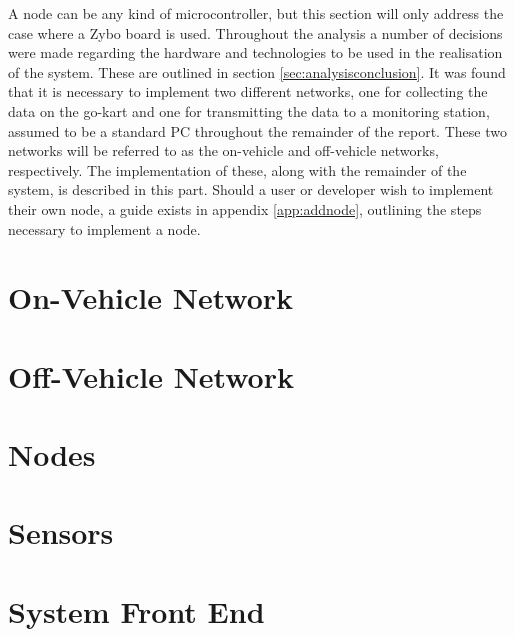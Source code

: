
A node can be any kind of microcontroller, but this section will only address the case where a Zybo board is used. 
Throughout the analysis a number of decisions were made regarding the hardware and technologies to be used in the realisation of the system.
These are outlined in section \ref{sec:analysisconclusion}.
It was found that it is necessary to implement two different networks, one for collecting the data on the go-kart and one for transmitting the data to a monitoring station, assumed to be a standard PC throughout the remainder of the report.
These two networks will be referred to as the on-vehicle and off-vehicle networks, respectively.
The implementation of these, along with the remainder of the system, is described in this part.
Should a user or developer wish to implement their own node, a guide exists in appendix \ref{app:addnode}, outlining the steps necessary to implement a node.

\section{On-Vehicle Network}






\section{Off-Vehicle Network}
\label{sec:wifi}

\section{Nodes}

\section{Sensors}

\section{System Front End}
